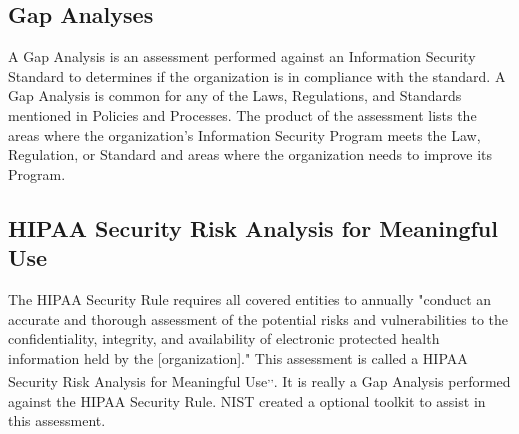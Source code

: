 \subsection{Gap Analyses}
A Gap Analysis is an assessment performed against an Information Security Standard to determines if the organization is in compliance with the standard. A Gap Analysis is common for any of the Laws, Regulations, and Standards mentioned in Policies and Processes. The product of the assessment lists the areas where the organization's Information Security Program meets the Law, Regulation, or Standard and areas where the organization needs to improve its Program.
\subsection{HIPAA Security Risk Analysis for Meaningful Use}
The HIPAA Security Rule requires all covered entities to annually "conduct an accurate and thorough assessment of the potential risks and vulnerabilities to the confidentiality, integrity, and availability of electronic protected health information held by the [organization]." This assessment is called a HIPAA Security Risk Analysis for Meaningful Use\textsuperscript{,}\textsuperscript{,}. It is really a Gap Analysis performed against the HIPAA Security Rule. NIST created a optional toolkit to assist in this assessment.
